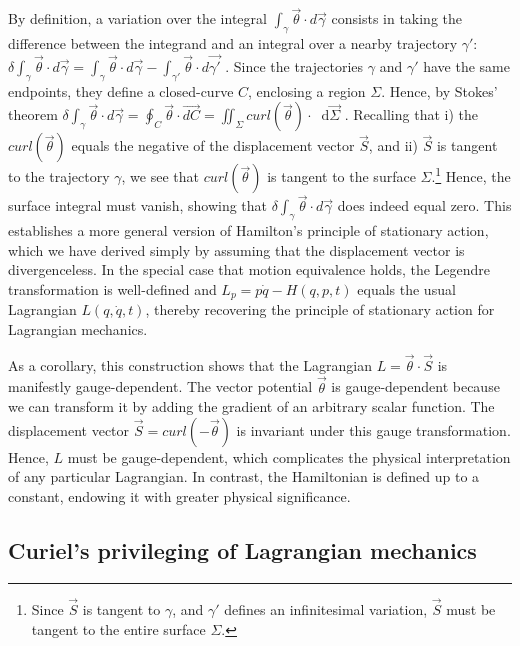 \documentclass[12pt, twoside]{article}
\newcommand{\diff}{\mathop{}\!\mathrm{d}} %
\renewcommand{\vector}[1]{\ensuremath{\vec{#1}}} %
\newcommand{\integral}{\int}
\begin{document}
By definition, a variation over the integral $\integral_{\gamma} \vector{\theta} \cdot d\vector{\gamma}$ consists in taking the difference between the integrand and an integral over a nearby trajectory $\gamma'$: $\delta \integral_{\gamma} \vector{\theta} \cdot d\vector{\gamma} = \integral_{\gamma} \vector{\theta} \cdot d\vector{\gamma} - \integral_{\gamma'} \vector{\theta} \cdot d\vector{\gamma'}$ . Since the trajectories $\gamma$ and $\gamma'$ have the same endpoints, they define a closed-curve $C$, enclosing a region $\Sigma $. Hence, by Stokes' theorem $\delta \integral_{\gamma} \vector{\theta} \cdot d\vector{\gamma} = \oint_{C} \vector{\theta}  \cdot \vector{dC} = \iint_{\Sigma} curl(\vector{\theta}) \cdot \diff \vector{\Sigma}$ . Recalling that i) the $curl(\vector{\theta})$ equals the negative of the displacement vector $\vector{S}$, and ii)  $\vector{S}$ is tangent to the trajectory $\gamma $, we see that $curl(\vector{\theta})$ is tangent to the surface $\Sigma $.\footnote{Since $\vector{S}$ is tangent to $\gamma $, and $\gamma'$ defines an infinitesimal variation, $\vector{S}$ must be tangent to the entire surface $\Sigma $.} Hence, the surface integral must vanish, showing that $\delta \integral_{\gamma} \vector{\theta} \cdot d\vector{\gamma}$ does indeed equal zero. This establishes a more general version of Hamilton's principle of stationary action, which we have derived simply by assuming that the displacement vector is divergenceless. In the special case that motion equivalence holds, the Legendre transformation is well-defined and $L_p = p \dot{q} - H(q, p, t)$ equals the usual Lagrangian $L(q, \dot{q}, t)$, thereby recovering the principle of stationary action for Lagrangian mechanics. 

As a corollary, this construction shows that the Lagrangian $L =\vector{\theta} \cdot \vector{S} $ is manifestly gauge-dependent. The vector potential $\vector{\theta}$ is gauge-dependent because we can transform it by adding the gradient of an arbitrary scalar function. The displacement vector $\vector{S} = curl(-\vector{\theta})$ is invariant under this gauge transformation. Hence, $L$ must be gauge-dependent, which complicates the physical interpretation of any particular Lagrangian. In contrast, the Hamiltonian is defined up to a constant, endowing it with greater physical significance.


\subsection{Curiel's privileging of Lagrangian mechanics}
\label{Curiel}
\end{document}

